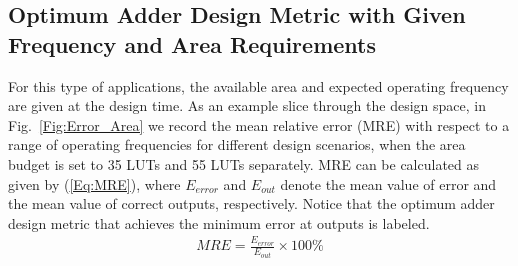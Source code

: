 \documentclass[10pt, conference, compsocconf]{IEEEtran}
\begin{document}
\subsection{Optimum Adder Design Metric with Given Frequency and Area Requirements}
For this type of applications, the available area and expected operating frequency are given at the design time. As an example slice through the design space, in Fig.~\ref{Fig:Error_Area} we record the mean relative error (MRE) with respect to a range of operating frequencies for different design scenarios, when the area budget is set to 35 LUTs and 55 LUTs separately. MRE can be calculated as given by (\ref{Eq:MRE}), where $E_{error}$ and $E_{out}$ denote the mean value of error and the mean value of correct outputs, respectively. Notice that the optimum adder design metric that achieves the minimum error at outputs is labeled. 
%
\begin{eqnarray}\label{Eq:MRE}
  MRE=\frac{E_{error}}{E_{out}}\times100\%
\end{eqnarray}
\end{document}
